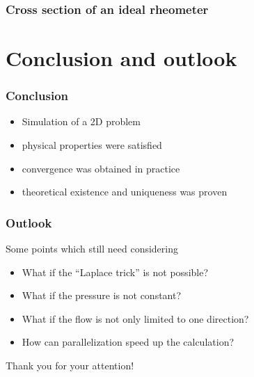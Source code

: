 \documentclass[12pt,a4paper]{beamer}
\theoremstyle{definition}
\theoremstyle{plain}
\begin{document}
\begin{frame}
    \frametitle{Cross section of an ideal rheometer}
    
\end{frame}
\section{Conclusion and outlook}
\begin{frame}
    \frametitle{Conclusion}
    \begin{itemize}[<+->]
        \item Simulation of a 2D problem 
        \item physical properties were satisfied
        \item convergence was obtained in practice
        \item theoretical existence and uniqueness was proven
    \end{itemize}
\end{frame}
\begin{frame}
    \frametitle{Outlook}
    Some points which still need considering
    \begin{itemize}[<+->]
        \item What if the \enquote{Laplace trick} is not possible?
        \item What if the pressure is not constant?
        \item What if the flow is not only limited to one direction? 
        \item How can parallelization speed up the calculation? 
    \end{itemize}
\end{frame}
\begin{frame}
\huge{Thank you for your attention!}
\end{frame}
\end{document}
